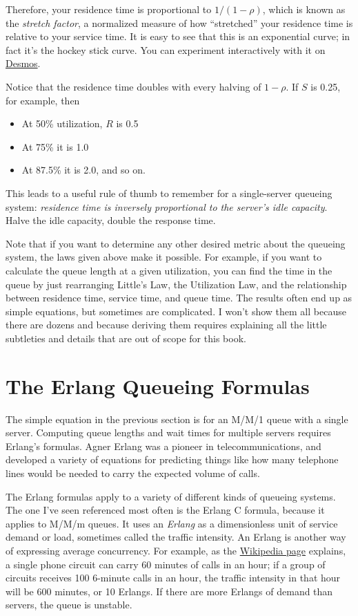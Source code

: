 \documentclass{vivid_layout}
\begin{document}
Therefore, your residence time is proportional to \( 1/(1-\rho) \), which is known as the {\itshape stretch factor}, a normalized measure of how ``stretched'' your residence time is relative to your service time. It is easy to see that this is an exponential curve; in fact it's the hockey stick curve. You can experiment interactively with it on \href{https://www.desmos.com/calculator/vhvwh6vjo7}{Desmos}.

Notice that the residence time doubles with every halving of \( 1-\rho \). If $S$ is 0.25, for example, then

\begin{itemize}
\item At 50\% utilization, \( R \) is 0.5
\item At 75\% it is 1.0
\item At 87.5\% it is 2.0, and so on.
\end{itemize}

This leads to a useful rule of thumb to remember for a single-server queueing system: {\itshape residence time is inversely proportional to the server's idle capacity}. Halve the idle capacity, double the response time.

Note that if you want to determine any other desired metric about the queueing system, the laws given above make it possible. For example, if you want to calculate the queue length at a given utilization, you can find the time in the queue by just rearranging Little's Law, the Utilization Law, and the relationship between residence time, service time, and queue time. The results often end up as simple equations, but sometimes are complicated. I won't show them all because there are dozens and because deriving them requires explaining all the little subtleties and details that are out of scope for this book.

\section{The Erlang Queueing Formulas}

The simple equation in the previous section is for an M/M/1 queue with a single server. Computing queue lengths and wait times for multiple servers requires Erlang's formulas. Agner Erlang was a pioneer in telecommunications, and developed a variety of equations for predicting things like how many telephone lines would be needed to carry the expected volume of calls.

The Erlang formulas apply to a variety of different kinds of queueing systems. The one I've seen referenced most often is the Erlang C formula, because it applies to M/M/m queues. It uses an {\itshape Erlang} as a dimensionless unit of service demand or load, sometimes called the traffic intensity. An Erlang is another way of expressing average concurrency. For example, as the \href{http://en.wikipedia.org}{Wikipedia page} explains, a single phone circuit can carry 60 minutes of calls in an hour; if a group of circuits receives 100 6-minute calls in an hour, the traffic intensity in that hour will be 600 minutes, or 10 Erlangs. If there are more Erlangs of demand than servers, the queue is unstable.
\end{document}
